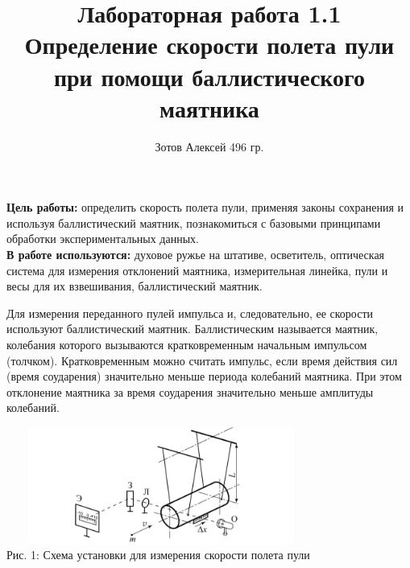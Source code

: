\documentclass[11pt]{article}
\begin{document}
    \author {Зотов Алексей 496 гр.}
    \title {Лабораторная работа 1.1 \\  Определение скорости полета пули при помощи баллистического маятника}
    \maketitle{}   

    \indent
    \textbf{Цель работы:} определить скорость полета пули, применяя законы сохранения и используя баллистический маятник, познакомиться с базовыми принципами обработки экспериментальных данных.
    \\ 
    \indent
    \textbf{В работе используются:} духовое ружье на штативе, осветитель, оптическая система для измерения отклонений маятника, измерительная линейка, пули и весы для их взвешивания, баллистический маятник.


    \small{
    Для измерения переданного пулей импульса и, следовательно, ее скорости используют баллистический маятник. Баллистическим называется маятник, колебания которого вызываются кратковременным начальным импульсом (толчком). Кратковременным можно считать импульс, если время действия сил (время соударения) значительно меньше периода колебаний маятника. При этом отклонение маятника за время соударения значительно меньше амплитуды колебаний.}

    \begin{center} 
        \includegraphics[width=4in , height = 1.5in]{ust.png} \\ Рис. 1: Схема установки для измерения скорости полета пули
    \end{center}
\end{document}
